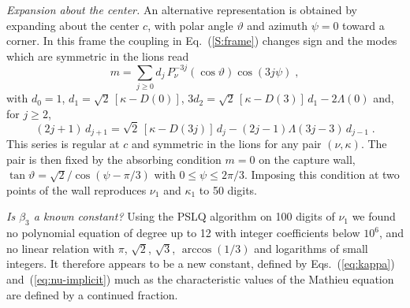 \emph{Expansion about the center.} An alternative representation is obtained by expanding about the center $c$, with polar angle $\vartheta$ and azimuth $\psi = 0$ toward a corner. In this frame the coupling in Eq.~(\ref{S:frame}) changes sign and the modes which are symmetric in the lions read
\begin{equation} \label{S:center-series}
    m = \sum_{j \geq 0} d_j \, P_\nu^{-3j}(\cos \vartheta) \cos(3 j \psi) \;,
\end{equation}
with $d_0 = 1$, $d_1 = \sqrt{2} \, [\kappa - D(0)]$, $3 d_2 = \sqrt{2} \, [\kappa - D(3)] \, d_1 - 2 \Lambda(0)$ and, for $j \geq 2$,
\begin{equation} \label{S:center-recurrence}
    (2j + 1) \, d_{j+1} = \sqrt{2} \, [\kappa - D(3j)] \, d_j - (2j - 1) \Lambda(3j - 3) \, d_{j-1} \;.
\end{equation}
This series is regular at $c$ and symmetric in the lions for any pair $(\nu, \kappa)$. The pair is then fixed by the absorbing condition $m = 0$ on the capture wall, $\tan \vartheta = \sqrt{2}/\cos(\psi - \pi/3)$ with $0 \leq \psi \leq 2\pi/3$. Imposing this condition at two points of the wall reproduces $\nu_1$ and $\kappa_1$ to 50 digits.

\emph{Is $\beta_3$ a known constant?} Using the PSLQ algorithm \cite{PSLQ} on 100 digits of $\nu_1$ we found no polynomial equation of degree up to 12 with integer coefficients below $10^6$, and no linear relation with $\pi$, $\sqrt{2}$, $\sqrt{3}$, $\arccos(1/3)$ and logarithms of small integers. It therefore appears to be a new constant, defined by Eqs.~(\ref{eq:kappa}) and~(\ref{eq:nu-implicit}) much as the characteristic values of the Mathieu equation are defined by a continued fraction.

